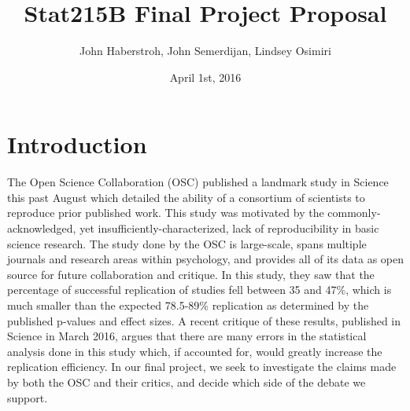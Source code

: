 \documentclass{article}
\title{Stat215B Final Project Proposal}
\author{John Haberstroh, John Semerdijan, Lindsey Osimiri}
\date{April 1st, 2016}
\begin{document}
\maketitle

\section{Introduction}
The Open Science Collaboration (OSC) published a landmark study in Science this past August which detailed the ability of a consortium of scientists to reproduce prior published work. This study was motivated by the commonly-acknowledged, yet insufficiently-characterized, lack of reproducibility in basic science research. The study done by the OSC is large-scale, spans multiple journals and research areas within psychology, and provides all of its data as open source for future collaboration and critique. In this study, they saw that the percentage of successful replication of studies fell between 35 and 47\%, which is much smaller than the expected 78.5-89\% replication as determined by the published p-values and effect sizes. A recent critique of these results, published in Science in March 2016, argues that there are many errors in the statistical analysis done in this study which, if accounted for, would greatly increase the replication efficiency. In our final project, we seek to investigate the claims made by both the OSC and their critics, and decide which side of the debate we support.
\end{document}
